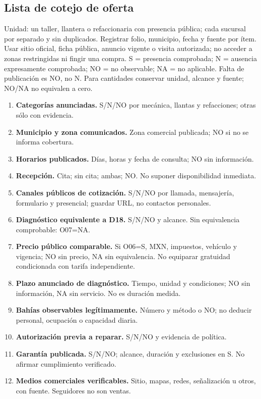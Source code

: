 {\subsection*{Lista de cotejo de oferta}
Unidad: un taller, llantera o refaccionaria con presencia pública; cada sucursal por separado y sin duplicados. Registrar folio, municipio, fecha y fuente por ítem. Usar sitio oficial, ficha pública, anuncio vigente o visita autorizada; no acceder a zonas restringidas ni fingir una compra. S = presencia comprobada; N = ausencia expresamente comprobada; NO = no observable; NA = no aplicable. Falta de publicación es NO, no N. Para cantidades conservar unidad, alcance y fuente; NO/NA no equivalen a cero.
\begin{enumerate}
\item[O01.] \textbf{Categorías anunciadas.} S/N/NO por mecánica, llantas y refacciones; otras sólo con evidencia.
\item[O02.] \textbf{Municipio y zona comunicados.} Zona comercial publicada; NO si no se informa cobertura.
\item[O03.] \textbf{Horarios publicados.} Días, horas y fecha de consulta; NO sin información.
\item[O04.] \textbf{Recepción.} Cita; sin cita; ambas; NO. No suponer disponibilidad inmediata.
\item[O05.] \textbf{Canales públicos de cotización.} S/N/NO por llamada, mensajería, formulario y presencial; guardar URL, no contactos personales.
\item[O06.] \textbf{Diagnóstico equivalente a D18.} S/N/NO y alcance. Sin equivalencia comprobable: O07=NA.
\item[O07.] \textbf{Precio público comparable.} Si O06=S, MXN, impuestos, vehículo y vigencia; NO sin precio, NA sin equivalencia. No equiparar gratuidad condicionada con tarifa independiente.
\item[O08.] \textbf{Plazo anunciado de diagnóstico.} Tiempo, unidad y condiciones; NO sin información, NA sin servicio. No es duración medida.
\item[O09.] \textbf{Bahías observables legítimamente.} Número y método o NO; no deducir personal, ocupación o capacidad diaria.
\item[O10.] \textbf{Autorización previa a reparar.} S/N/NO y evidencia de política.
\item[O11.] \textbf{Garantía publicada.} S/N/NO; alcance, duración y exclusiones en S. No afirmar cumplimiento verificado.
\item[O12.] \textbf{Medios comerciales verificables.} Sitio, mapas, redes, señalización u otros, con fuente. Seguidores no son ventas.

\end{enumerate}}
